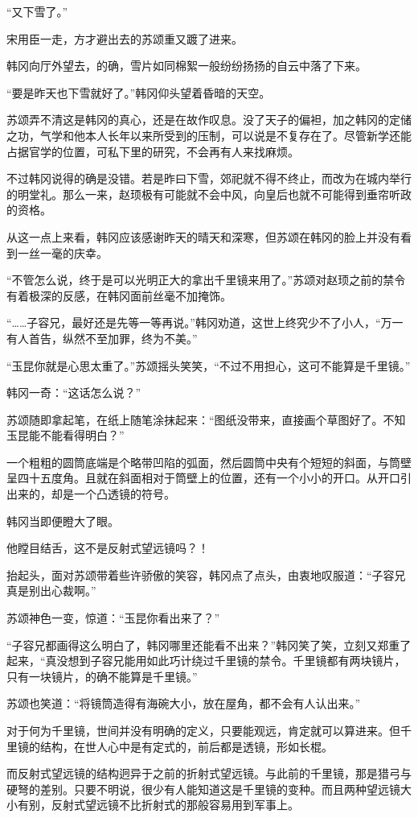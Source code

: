“又下雪了。”

宋用臣一走，方才避出去的苏颂重又踱了进来。

韩冈向厅外望去，的确，雪片如同棉絮一般纷纷扬扬的自云中落了下来。

“要是昨天也下雪就好了。”韩冈仰头望着昏暗的天空。

苏颂弄不清这是韩冈的真心，还是在故作叹息。没了天子的偏袒，加之韩冈的定储之功，气学和他本人长年以来所受到的压制，可以说是不复存在了。尽管新学还能占据官学的位置，可私下里的研究，不会再有人来找麻烦。

不过韩冈说得的确是没错。若是昨曰下雪，郊祀就不得不终止，而改为在城内举行的明堂礼。那么一来，赵顼极有可能就不会中风，向皇后也就不可能得到垂帘听政的资格。

从这一点上来看，韩冈应该感谢昨天的晴天和深寒，但苏颂在韩冈的脸上并没有看到一丝一毫的庆幸。

“不管怎么说，终于是可以光明正大的拿出千里镜来用了。”苏颂对赵顼之前的禁令有着极深的反感，在韩冈面前丝毫不加掩饰。

“……子容兄，最好还是先等一等再说。”韩冈劝道，这世上终究少不了小人，“万一有人首告，纵然不至加罪，终为不美。”

“玉昆你就是心思太重了。”苏颂摇头笑笑，“不过不用担心，这可不能算是千里镜。”

韩冈一奇：“这话怎么说？”

苏颂随即拿起笔，在纸上随笔涂抹起来：“图纸没带来，直接画个草图好了。不知玉昆能不能看得明白？”

一个粗粗的圆筒底端是个略带凹陷的弧面，然后圆筒中央有个短短的斜面，与筒壁呈四十五度角。且就在斜面相对于筒壁上的位置，还有一个小小的开口。从开口引出来的，却是一个凸透镜的符号。

韩冈当即便瞪大了眼。

他瞠目结舌，这不是反射式望远镜吗？！

抬起头，面对苏颂带着些许骄傲的笑容，韩冈点了点头，由衷地叹服道：“子容兄真是别出心裁啊。”

苏颂神色一变，惊道：“玉昆你看出来了？”

“子容兄都画得这么明白了，韩冈哪里还能看不出来？”韩冈笑了笑，立刻又郑重了起来，“真没想到子容兄能用如此巧计绕过千里镜的禁令。千里镜都有两块镜片，只有一块镜片，的确不能算是千里镜。”

苏颂也笑道：“将镜筒造得有海碗大小，放在屋角，都不会有人认出来。”

对于何为千里镜，世间并没有明确的定义，只要能观远，肯定就可以算进来。但千里镜的结构，在世人心中是有定式的，前后都是透镜，形如长棍。

而反射式望远镜的结构迥异于之前的折射式望远镜。与此前的千里镜，那是猎弓与硬弩的差别。只要不明说，很少有人能知道这是千里镜的变种。而且两种望远镜大小有别，反射式望远镜不比折射式的那般容易用到军事上。

